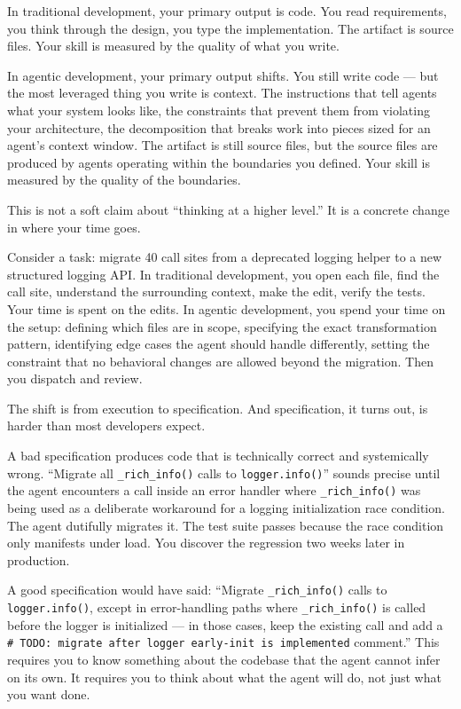 \documentclass[
  a4paper,
  DIV=11,
  numbers=noendperiod]{scrreprt}
\begin{document}
In traditional development, your primary output is code. You read
requirements, you think through the design, you type the implementation.
The artifact is source files. Your skill is measured by the quality of
what you write.

In agentic development, your primary output shifts. You still write code
--- but the most leveraged thing you write is context. The instructions
that tell agents what your system looks like, the constraints that
prevent them from violating your architecture, the decomposition that
breaks work into pieces sized for an agent's context window. The
artifact is still source files, but the source files are produced by
agents operating within the boundaries you defined. Your skill is
measured by the quality of the boundaries.

This is not a soft claim about ``thinking at a higher level.'' It is a
concrete change in where your time goes.

Consider a task: migrate 40 call sites from a deprecated logging helper
to a new structured logging API. In traditional development, you open
each file, find the call site, understand the surrounding context, make
the edit, verify the tests. Your time is spent on the edits. In agentic
development, you spend your time on the setup: defining which files are
in scope, specifying the exact transformation pattern, identifying edge
cases the agent should handle differently, setting the constraint that
no behavioral changes are allowed beyond the migration. Then you
dispatch and review.

The shift is from execution to specification. And specification, it
turns out, is harder than most developers expect.

A bad specification produces code that is technically correct and
systemically wrong. ``Migrate all \texttt{\_rich\_info()} calls to
\texttt{logger.info()}'' sounds precise until the agent encounters a
call inside an error handler where \texttt{\_rich\_info()} was being
used as a deliberate workaround for a logging initialization race
condition. The agent dutifully migrates it. The test suite passes
because the race condition only manifests under load. You discover the
regression two weeks later in production.

A good specification would have said: ``Migrate \texttt{\_rich\_info()}
calls to \texttt{logger.info()}, except in error-handling paths where
\texttt{\_rich\_info()} is called before the logger is initialized ---
in those cases, keep the existing call and add a
\texttt{\#\ TODO:\ migrate\ after\ logger\ early-init\ is\ implemented}
comment.'' This requires you to know something about the codebase that
the agent cannot infer on its own. It requires you to think about what
the agent will do, not just what you want done.
\end{document}
